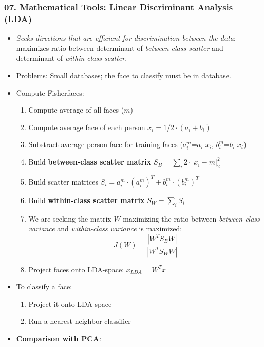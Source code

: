 \documentclass[a4paper]{article}
\begin{document}
    \subsubsection*{07. Mathematical Tools: Linear Discriminant Analysis (LDA)}
      \begin{itemize}
        \item \emph{Seeks directions that are efficient for discrimination between the data}: maximizes ratio between determinant of \emph{between-class scatter} and determinant of \emph{within-class scatter}.
        \item Problems: Small databases; the face to classify must be in database.
        \item Compute Fisherfaces:
        \begin{enumerate}
          \item Compute average of all faces ($m$)
          \item Compute average face of each person $x_i=1/2\cdot (a_i+b_i)$
          \item Substract average person face for training faces ($a_i^m$=$a_i$-$x_i$, $b_i^m$=$b_i$-$x_i$)
          \item Build \textbf{between-class scatter matrix} $S_B=\sum_i{2\cdot|x_i-m|^2_2}$
          \item Build scatter matrices $S_i=a_i^m\cdot (a_i^m)^T + b_i^m\cdot (b_i^m)^T$
          \item Build \textbf{within-class scatter matrix} $S_W=\sum_i{S_i}$
          \item We are seeking the matrix $W$ maximizing the ratio between \emph{between-class variance} and \emph{within-class variance} is maximized: $$J(W)=\frac{|W^TS_BW|}{|W^TS_WW|}$$
          \item Project faces onto LDA-space: $x_{LDA}=W^Tx$
        \end{enumerate}
        \item To classify a face:
        \begin{enumerate}
          \item Project it onto LDA space
          \item Run a nearest-neighbor classifier
        \end{enumerate}
        \item \textbf{Comparison with PCA}:
          \begin{table}[htp]
            \centering
            \renewcommand{\arraystretch}{1.2}
            \begin{tabular}{ll}

\end{tabular}
\end{table}
\end{itemize}
\end{document}
